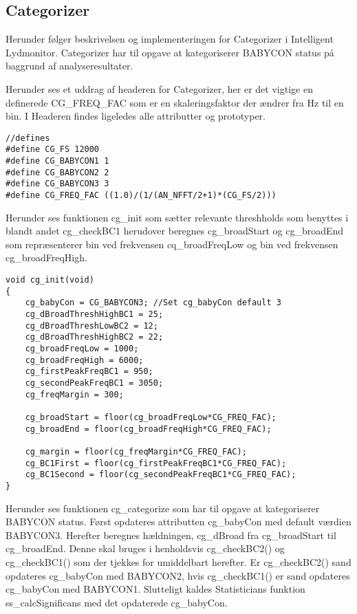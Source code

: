 \subsection{Categorizer}
Herunder følger beskrivelsen og implementeringen for Categorizer i Intelligent Lydmonitor.
Categorizer har til opgave at kategoriserer BABYCON status på baggrund af analyseresultater. 


Herunder ses et uddrag af headeren for Categorizer, her er det vigtige en definerede CG\_FREQ\_FAC som er en skaleringsfaktor der ændrer fra Hz til en bin. I Headeren findes ligeledes alle attributter og prototyper.

\begin{verbatim}
//defines
#define CG_FS 12000
#define CG_BABYCON1 1
#define CG_BABYCON2 2
#define CG_BABYCON3 3
#define CG_FREQ_FAC ((1.0)/(1/(AN_NFFT/2+1)*(CG_FS/2)))
\end{verbatim}

Herunder ses funktionen cg\_init som sætter relevante threshholds som benyttes i blandt andet cg\_checkBC1 herudover beregnes cg\_broadStart og cg\_broadEnd som repræsenterer bin ved frekvensen cq\_broadFreqLow og bin ved frekvensen cg\_broadFreqHigh. 

\begin{verbatim}
void cg_init(void)
{
	cg_babyCon = CG_BABYCON3; //Set cg_babyCon default 3
	cg_dBroadThreshHighBC1 = 25;
	cg_dBroadThreshLowBC2 = 12;
	cg_dBroadThreshHighBC2 = 22;
	cg_broadFreqLow = 1000;
	cg_broadFreqHigh = 6000;
	cg_firstPeakFreqBC1 = 950;
	cg_secondPeakFreqBC1 = 3050;
	cg_freqMargin = 300;

	cg_broadStart = floor(cg_broadFreqLow*CG_FREQ_FAC);
	cg_broadEnd = floor(cg_broadFreqHigh*CG_FREQ_FAC);

	cg_margin = floor(cg_freqMargin*CG_FREQ_FAC);
	cg_BC1First = floor(cg_firstPeakFreqBC1*CG_FREQ_FAC);
	cg_BC1Second = floor(cg_secondPeakFreqBC1*CG_FREQ_FAC);
}
\end{verbatim}

Herunder ses funktionen cg\_categorize som har til opgave at kategoriserer BABYCON status. 
Først opdateres attributten cg\_babyCon med default værdien BABYCON3. 
Herefter beregnes hældningen, cg\_dBroad fra cg\_broadStart til cg\_broadEnd. Denne skal bruges i henholdsvis cg\_checkBC2() og cg\_checkBC1() som der tjekkes for umiddelbart herefter. Er cg\_checkBC2() sand opdateres cg\_babyCon med BABYCON2, hvis cg\_checkBC1() er sand opdateres cg\_babyCon med BABYCON1.
Slutteligt kaldes Statisticians funktion ss\_calcSignificans med det opdaterede cg\_babyCon.

